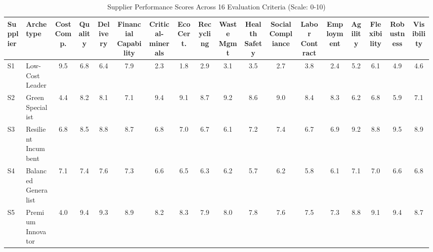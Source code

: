 \begin{table}
\caption{Supplier Performance Scores Across 16 Evaluation Criteria (Scale: 0-10)}
\label{tab:supplier_scores}
\begin{tabular}{l l c c c c c c c c c c c c c c c c}
\toprule
Supplier & Archetype & Cost Comp. & Quality & Delivery & Financial Capability & Critical-minerals & Eco Cert. & Recycling & Waste Mgmt & Health Safety & Social Compliance & Labor Contract & Employment & Agility & Flexibility & Robustness & Visibility \\
\midrule
S1 & Low-Cost Leader & 9.5 & 6.8 & 6.4 & 7.9 & 2.3 & 1.8 & 2.9 & 3.1 & 3.5 & 2.7 & 3.8 & 2.4 & 5.2 & 6.1 & 4.9 & 4.6 \\
S2 & Green Specialist & 4.4 & 8.2 & 8.1 & 7.1 & 9.4 & 9.1 & 8.7 & 9.2 & 8.6 & 9.0 & 8.4 & 8.3 & 6.2 & 6.8 & 5.9 & 7.1 \\
S3 & Resilient Incumbent & 6.8 & 8.5 & 8.8 & 8.7 & 6.8 & 7.0 & 6.7 & 6.1 & 7.2 & 7.4 & 6.7 & 6.9 & 9.2 & 8.8 & 9.5 & 8.9 \\
S4 & Balanced Generalist & 7.1 & 7.4 & 7.6 & 7.3 & 6.6 & 6.5 & 6.3 & 6.2 & 5.7 & 6.2 & 5.8 & 6.1 & 7.1 & 7.0 & 6.6 & 6.8 \\
S5 & Premium Innovator & 4.0 & 9.4 & 9.3 & 8.9 & 8.2 & 8.3 & 7.9 & 8.0 & 7.8 & 7.6 & 7.5 & 7.3 & 8.8 & 9.1 & 9.4 & 8.7 \\
\bottomrule
\end{tabular}
\end{table}
